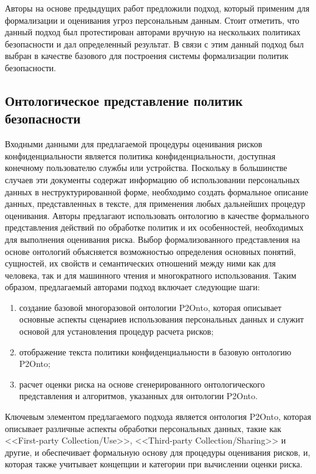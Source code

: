 \documentclass[../main]{subfiles}
\begin{document}
Авторы \cite{P2Onto} на основе предыдущих работ предложили подход, который применим для формализации и оценивания угроз персональным данным. Стоит отметить, что данный подход был протестирован авторами вручную на нескольких политиках безопасности и дал определенный результат. В связи с этим данный подход был выбран в качестве базового для построения системы формализации политик безопасности.

\subsection{Онтологическое представление политик безопасности}

Входными данными для предлагаемой процедуры оценивания рисков конфиденциальности является политика конфиденциальности, доступная конечному пользователю службы или устройства. Поскольку в большинстве случаев эти документы содержат информацию об использовании персональных данных в неструктурированной форме, необходимо создать формальное описание данных, представленных в тексте, для применения любых дальнейших процедур оценивания. Авторы \cite{P2Onto} предлагают использовать онтологию в качестве формального представления действий по обработке политик и их особенностей, необходимых для выполнения оценивания риска. Выбор формализованного представления на основе онтологий объясняется возможностью определения основных понятий, сущностей, их свойств и семантических отношений между ними как для человека, так и для машинного чтения и многократного использования. Таким образом, предлагаемый авторами подход включает следующие шаги: 
\begin{enumerate}
    \item создание базовой многоразовой онтологии P2Onto, которая описывает основные аспекты сценариев использования персональных данных и служит основой для установления процедур расчета рисков;
    \item отображение текста политики конфиденциальности в базовую онтологию P2Onto;
    \item расчет оценки риска на основе сгенерированного онтологического представления и алгоритмов, указанных для онтологии P2Onto.
\end{enumerate}

Ключевым элементом предлагаемого подхода является онтология P2Onto, которая описывает различные аспекты обработки персональных данных, такие как <<First-party Collection/Use>>, <<Third-party Collection/Sharing>> и другие, и обеспечивает формальную основу для процедуры оценивания рисков, и, которая также учитывает концепции и категории при вычислении оценки риска.
\end{document}
